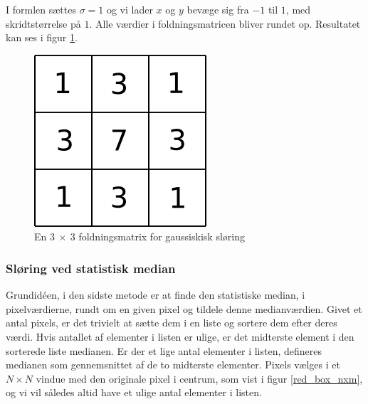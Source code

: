 {I formlen sættes $\sigma = 1$ og vi lader $x$ og $y$ bevæge sig fra $-1$
til $1$, med skridtstørrelse på $1$. Alle værdier i foldningsmatricen
bliver rundet op. Resultatet kan ses i figur \ref{gauss}.

\begin{figure}[h]
	\begin{center}
		\includegraphics[scale=0.5,angle=0]{afsnit/vores_implementation/billeder/sloering/gauss}
	\end{center}
	\caption[]{En $3~\times{}~3$ foldningsmatrix for gaussiskisk sløring}
	\label{gauss}
\end{figure}

\subsubsection{Sløring ved statistisk median}
Grundidéen, i den sidste metode er at finde den statistiske median, i
pixelværdierne, rundt om en given pixel og tildele denne medianværdien.
Givet et antal pixels, er det trivielt at sætte dem i en liste og
sortere dem efter deres værdi. Hvis antallet af elementer i listen er
ulige, er det midterste element i den sorterede liste medianen. Er der
et lige antal elementer i listen, defineres medianen som gennemsnittet
af de to midterste elementer.  Pixels vælges i et $N \times N$ vindue
med den originale pixel i centrum, som vist i figur \ref{red_box_nxm},
og vi vil således altid have et ulige antal elementer i listen.

}
